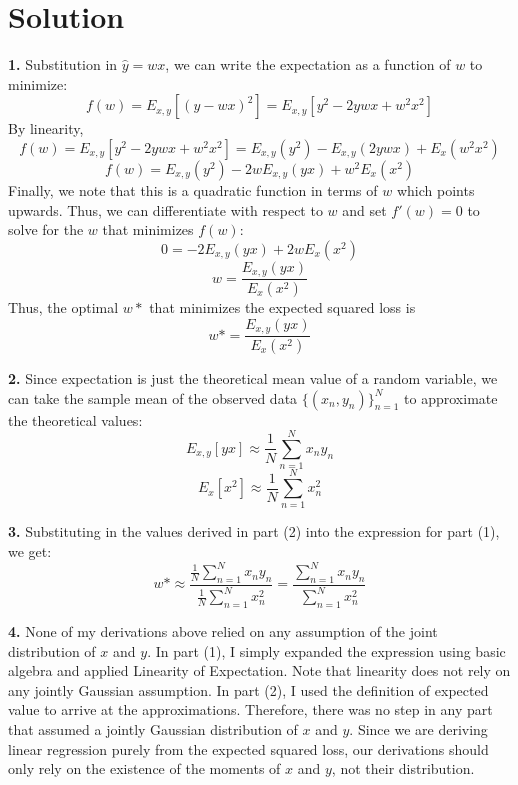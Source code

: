 \documentclass[submit]{../harvardml}
\newenvironment{solution}
  {\color{black}\section*{Solution}}
{}
\begin{document}
\newpage
\begin{solution}
    \begin{tcolorbox}
        \textbf{1.} Substitution in $\hat{y} = wx$, we can write the expectation as a function of $w$ to minimize:
        $$f(w) = E_{x,y}[ ( y - wx )^2] = E_{x,y}[y^2 - 2ywx + w^2x^2]$$
        By linearity, 
        $$f(w) = E_{x,y}[y^2 - 2ywx + w^2x^2] = E_{x,y}(y^2)- E_{x,y}(2ywx) + E_x(w^2x^2)$$
        $$f(w) = E_{x,y}(y^2)- 2wE_{x,y}(yx) + w^2 E_x(x^2)$$
        Finally, we note that this is a quadratic function in terms of $w$ which points upwards. Thus, we can differentiate with respect to $w$ and set $f'(w) = 0$ to solve for the $w$ that minimizes $f(w)$:
        $$0 = -2E_{x,y}(yx) + 2w E_x(x^2)$$
        $$w = \frac{E_{x,y}(yx)}{E_x(x^2)}$$
        Thus, the optimal $w*$ that minimizes the expected squared loss is
        $$w* = \frac{E_{x,y}(yx)}{E_x(x^2)}$$
    \end{tcolorbox}
    \begin{tcolorbox}
        \textbf{2.} Since expectation is just the theoretical mean value of a random variable, we can take the sample mean of the observed data $\{(x_n,y_n)\}_{n=1}^N$ to approximate the theoretical values:
        $$E_{x, y}[yx] \approx \frac{1}{N} \sum_{n = 1}^N x_ny_n$$
        $$E_x[x^2] \approx \frac{1}{N} \sum_{n=1}^N x_n^2$$
    \end{tcolorbox}
    \begin{tcolorbox}
        \textbf{3.} Substituting in the values derived in part (2) into the expression for part (1), we get:
        $$w* \approx \frac{\frac{1}{N} \sum_{n = 1}^N x_ny_n}{\frac{1}{N} \sum_{n=1}^N x_n^2} = \frac{\sum_{n = 1}^N x_ny_n}{\sum_{n=1}^N x_n^2}$$
    \end{tcolorbox}
    \begin{tcolorbox}
        \textbf{4.} None of my derivations above relied on any assumption of the joint distribution of $x$ and $y$. In part (1), I simply expanded the expression using basic algebra and applied Linearity of Expectation. Note that linearity does not rely on any jointly Gaussian assumption. In part (2), I used the definition of expected value to arrive at the approximations. Therefore, there was no step in any part that assumed a jointly Gaussian distribution of $x$ and $y$. Since we are deriving linear regression purely from the expected squared loss, our derivations should only rely on the existence of the moments of $x$ and $y$, not their distribution.
    \end{tcolorbox}
\end{solution}
\end{document}

